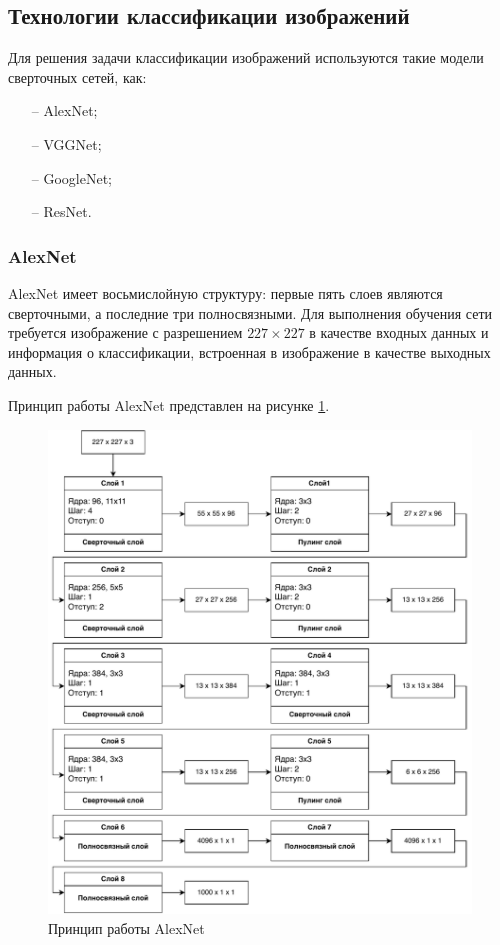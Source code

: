 \subsection{Технологии классификации изображений}
Для решения задачи классификации изображений используются такие модели сверточных сетей, как\cite{models-comprasion}: 
\begin{itemize}[leftmargin=1.6\parindent]
	\item[--] AlexNet;
	\item[--] VGGNet;
	\item[--] GoogleNet;
	\item[--] ResNet.
\end{itemize}

\subsubsection{AlexNet}
 AlexNet имеет восьмислойную структуру: первые пять слоев являются сверточными, а последние три полносвязными. Для выполнения обучения сети требуется изображение с разрешением $227 \times 227$ в качестве входных данных и информация о классификации, встроенная в изображение в качестве выходных данных.
 
Принцип работы AlexNet представлен на рисунке \ref{fig:alexnet}.

\begin{figure}[H]
	\centering
	\includegraphics[scale=0.8]{img/alexnet.pdf}
	\caption{Принцип работы AlexNet}
	\label{fig:alexnet}
\end{figure}
\clearpage

